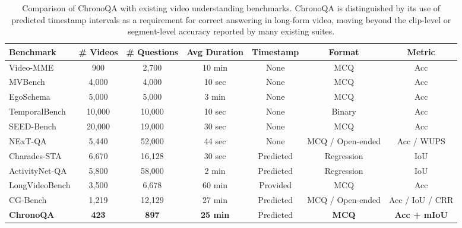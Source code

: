 \documentclass[sigconf,natbib=false,nonacm]{acmart}
\begin{document}
\begin{table}[t]
  \centering
  \caption{Comparison of ChronoQA with existing video understanding benchmarks. ChronoQA is distinguished by its use of predicted timestamp intervals as a requirement for correct answering in long-form video, moving beyond the clip-level or segment-level accuracy reported by many existing suites.}
  \label{tab:benchmark_comparison}
  \begin{tabular}{lcccccc}
    \toprule
    \textbf{Benchmark} & \textbf{\# Videos} & \textbf{\# Questions} & \textbf{Avg Duration} & \textbf{Timestamp} & \textbf{Format} & \textbf{Metric} \\
    \midrule
    Video-MME \cite{videomme} & 900 & 2,700 & 10 min & None & MCQ & Acc \\
    MVBench \cite{mvbench} & 4,000 & 4,000 & 10 sec & None & MCQ & Acc \\
    EgoSchema \cite{egoschema} & 5,000 & 5,000 & 3 min & None & MCQ & Acc \\
    TemporalBench & 10,000 & 10,000 & 10 sec & None & Binary & Acc \\
    SEED-Bench \cite{seedbench} & 20,000 & 19,000 & 30 sec & None & MCQ & Acc \\
    NExT-QA \cite{nextqa} & 5,440 & 52,000 & 44 sec & None & MCQ / Open-ended & Acc / WUPS \\
    Charades-STA \cite{charades} & 6,670 & 16,128 & 30 sec & Predicted & Regression & IoU \\
    ActivityNet-QA \cite{activitynetqa} & 5,800 & 58,000 & 2 min & Predicted & Regression & IoU \\
    LongVideoBench \cite{lvbench} & 3,500 & 6,678 & 60 min & Provided & MCQ & Acc \\
    CG-Bench \cite{cgbench} & 1,219 & 12,129 & 27 min & Predicted & MCQ / Open-ended & Acc / IoU / CRR \\
    \midrule
    \textbf{ChronoQA} & \textbf{423} & \textbf{897} & \textbf{25 min} & Predicted & \textbf{MCQ} & \textbf{Acc + mIoU} \\
    \bottomrule
  \end{tabular}
\end{table}
\end{document}
